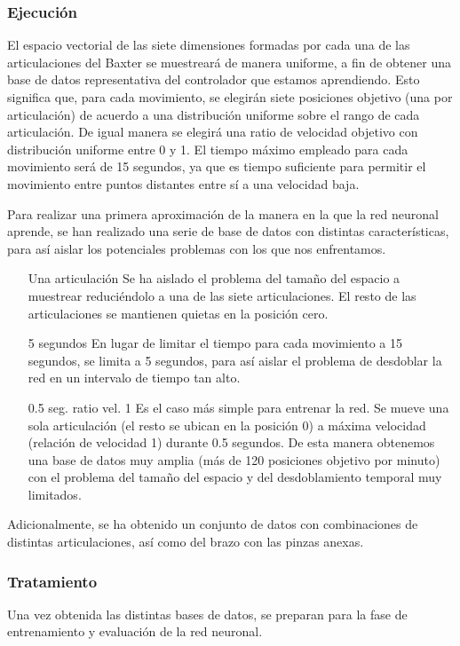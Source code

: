 \subsubsection{Ejecución}
El espacio vectorial de las siete dimensiones formadas por cada una de las articulaciones del Baxter se muestreará de manera uniforme, a fin de obtener una base de datos representativa del controlador que estamos aprendiendo. Esto significa que, para cada movimiento, se elegirán siete posiciones objetivo (una por articulación) de acuerdo a una distribución uniforme sobre el rango de cada articulación. De igual manera se elegirá una ratio de velocidad objetivo con distribución uniforme entre 0 y 1. El tiempo máximo empleado para cada movimiento será de 15 segundos, ya que es tiempo suficiente para permitir el movimiento entre puntos distantes entre sí a una velocidad baja.

Para realizar una primera aproximación de la manera en la que la red neuronal aprende, se han realizado una serie de base de datos con distintas características, para así aislar los potenciales problemas con los que nos enfrentamos.

\begin{itemize}
\item [Una articulación] Se ha aislado el problema del tamaño del espacio a muestrear reduciéndolo a una de las siete articulaciones. El resto de las articulaciones se mantienen quietas en la posición cero.
\item [5 segundos] En lugar de limitar el tiempo para cada movimiento a 15 segundos, se limita a 5 segundos, para así aislar el problema de desdoblar la red en un intervalo de tiempo tan alto.
\item [0.5 seg. ratio vel. 1] Es el caso más simple para entrenar la red. Se mueve una sola articulación (el resto se ubican en la posición 0) a máxima velocidad (relación de velocidad 1) durante 0.5 segundos. De esta manera obtenemos una base de datos muy amplia (más de 120 posiciones objetivo por minuto) con el problema del tamaño del espacio y del desdoblamiento temporal muy limitados.
\end{itemize}

Adicionalmente, se ha obtenido un conjunto de datos con combinaciones de distintas articulaciones, así como del brazo con las pinzas anexas.

\subsubsection{Tratamiento}
Una vez obtenida las distintas bases de datos, se preparan para la fase de entrenamiento y evaluación de la red neuronal.

